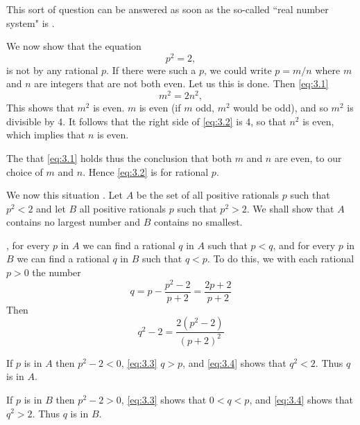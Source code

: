 This sort of question can be answered as soon as the so-called ``real number system" is .
\begin{theorem}
  We now show that the equation
  \begin{equation}\label{eq:3.1}
    p^2 = 2,
  \end{equation}
  is not  by any rational $p$. If there were such a $p$, we could write $p=m / n$ where $m$ and $n$ are integers that are not both even. Let us  this is done. Then \eqref{eq:3.1} 
  \begin{equation}\label{eq:3.2}
    m^2 = 2n^2,
  \end{equation}
  This shows that $m^2$ is even.  $m$ is even (if $m$  odd, $m^2$ would be odd), and so $m^2$ is divisible by 4. It follows that the right side of \eqref{eq:3.2} is  4, so that $n^2$ is even, which implies that $n$ is even.

  The  that \eqref{eq:3.1} holds thus  the conclusion that both $m$ and $n$ are even,  to our choice of $m$ and $n$. Hence \eqref{eq:3.2} is  for rational $p$.

  We now  this situation . Let $A$ be the set of all positive rationals $p$ such that $p^2<2$ and let $B$  all positive rationals $p$ such that $p^2>2$. We shall show that $A$ contains no largest number and $B$ contains no smallest.

  , for every $p$ in $A$ we can find a rational $q$ in $A$ such that $p<q$, and for every $p$ in $B$ we can find a rational $q$ in $B$ such that $q<p$. To do this, we  with each rational $p>0$ the number
  \begin{equation}\label{eq:3.3}
    q=p-\frac{p^2-2}{p+2}=\frac{2 p+2}{p+2}
  \end{equation}
  Then
  \begin{equation}\label{eq:3.4}
    q^2-2=\frac{2\left(p^2-2\right)}{(p+2)^2}
  \end{equation}
  
  If $p$ is in $A$ then $p^2-2<0$, \eqref{eq:3.3}  $q>p$, and \eqref{eq:3.4} shows that $q^2<2$. Thus $q$ is in $A$.

  If $p$ is in $B$ then $p^2-2>0$, \eqref{eq:3.3} shows that $0<q<p$, and \eqref{eq:3.4} shows that $q^2>2$. Thus $q$ is in $B$.
\end{theorem}

